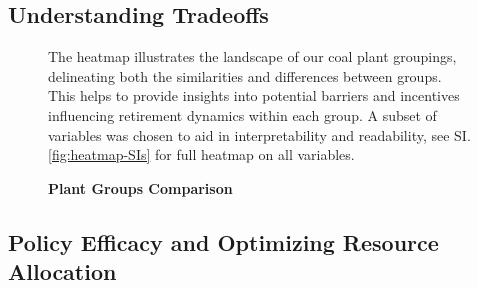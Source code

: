 \subsection{Understanding Tradeoffs}

\begin{figure}[H]
      
    \caption{\textbf{Plant Groups Comparison}}
    \medskip
    \footnotesize
    The heatmap illustrates the landscape of our coal plant groupings, delineating both the similarities and differences between groups. This helps to provide insights into potential barriers and incentives influencing retirement dynamics within each group.
    A subset of variables was chosen to aid in interpretability and readability, see SI.\ref{fig:heatmap-SIs} for full heatmap on all variables.
    \label{fig:heatmap}
\end{figure}

\subsection{Policy Efficacy and Optimizing Resource Allocation}

